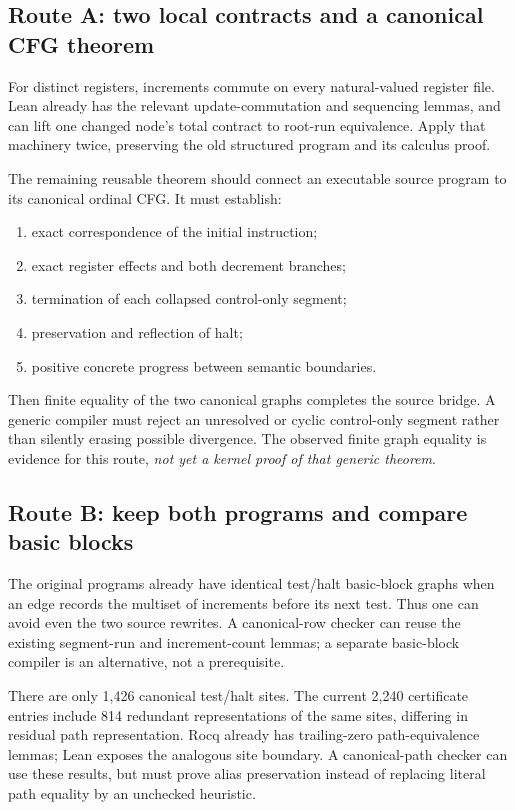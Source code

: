 \documentclass[11pt]{article}
\newcommand{\file}[1]{{\small\path{#1}}}
\begin{document}
\subsection{Route A: two local contracts and a canonical CFG theorem}
For distinct registers, increments commute on every natural-valued register file. Lean already has the relevant update-commutation and sequencing lemmas, and \file{RMTransfer.closed_of_contract} can lift one changed node's total contract to root-run equivalence. Apply that machinery twice, preserving the old structured program and its calculus proof.

The remaining reusable theorem should connect an executable source program to its canonical ordinal CFG. It must establish:
\begin{enumerate}
\item exact correspondence of the initial instruction;
\item exact register effects and both decrement branches;
\item termination of each collapsed control-only segment;
\item preservation and reflection of halt;
\item positive concrete progress between semantic boundaries.
\end{enumerate}
Then finite equality of the two canonical graphs completes the source bridge. A generic compiler must reject an unresolved or cyclic control-only segment rather than silently erasing possible divergence. The observed finite graph equality is evidence for this route, \emph{not yet a kernel proof of that generic theorem}.

\subsection{Route B: keep both programs and compare basic blocks}
The original programs already have identical test/halt basic-block graphs when an edge records the multiset of increments before its next test. Thus one can avoid even the two source rewrites. A canonical-row checker can reuse the existing segment-run and increment-count lemmas; a separate basic-block compiler is an alternative, not a prerequisite.

There are only 1,426 canonical test/halt sites. The current 2,240 certificate entries include 814 redundant representations of the same sites, differing in residual path representation. Rocq already has trailing-zero path-equivalence lemmas; Lean exposes the analogous site boundary. A canonical-path checker can use these results, but must prove alias preservation instead of replacing literal path equality by an unchecked heuristic.
\end{document}
